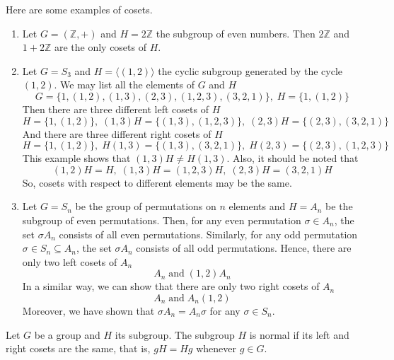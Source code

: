 \begin{examples}
Here are some examples of cosets.
\begin{enumerate}
\item Let $G = (\mathbb Z, +)$ and $H = 2\mathbb Z$ the subgroup of even numbers.
Then $2\mathbb Z$ and $1 + 2\mathbb Z$ are the only cosets of $H$.

\item Let $G = S_3$ and $H = \langle (1, 2)\rangle$ the cyclic subgroup generated by the cycle $(1,2)$.
We may list all the elements of $G$ and $H$
\[
G = \{1, (1,2), (1, 3), (2, 3), (1, 2, 3), (3, 2, 1)\},\; H = \{1, (1, 2)\}
\]
Then there are three different left cosets of $H$
\[
H = \{1, (1, 2)\}, \;(1,3)H = \{(1, 3), (1, 2, 3)\},\;(2, 3)H = \{(2, 3), (3,2,1)\}
\]
And there are three different right cosets of $H$
\[
H =  \{1, (1, 2)\}, \; H(1, 3) = \{(1, 3), (3, 2, 1)\},\; H (2, 3) = \{(2, 3), (1, 2, 3)\}
\]
This example shows that $(1, 3) H \neq H (1, 3)$.
Also, it should be noted that
\[
(1, 2)H = H,\; (1, 3)H = (1, 2, 3)H,\; (2, 3)H = (3, 2, 1)H
\]
So, cosets with respect to different elements may be the same.

\item Let $G = S_n$ be the group of permutations on $n$ elements and $H = A_n$ be the subgroup of even permutations.
Then, for any even permutation $\sigma\in A_n$, the set $\sigma A_n$ consists of all even permutations.
Similarly, for any odd permutation $\sigma\in S_n\subseteq A_n$, the set $\sigma A_n$ consists of all odd permutations.
Hence, there are only two left cosets of $A_n$
\[
A_n\;\text{and}\;(1, 2) A_n
\]
In a similar way, we can show that there are only two right cosets of $A_n$
\[
A_n\;\text{and}\; A_n(1, 2)
\]
Moreover, we have shown that $\sigma A_n = A_n \sigma$ for any $\sigma \in S_n$.
\end{enumerate}
\end{examples}

\begin{definition}
Let $G$ be a group and $H$ its subgroup.
The subgroup $H$ is normal if its left and right cosets are the same, that is, $gH = Hg$ whenever $g\in G$.
\end{definition}

